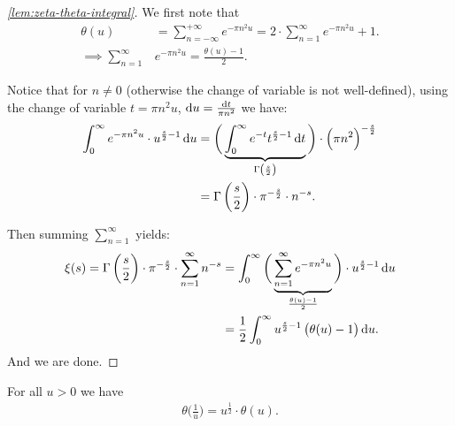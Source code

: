 \begin{proof}[\ref{lem:zeta-theta-integral}]
We first note that
\begin{align*}
    \theta(u) &= \sum_{n=-\infty}^{+\infty} e^{- \pi n^2 u} = 2 \cdot \sum_{n=1 }^{\infty} e^{- \pi n^2 u} + 1.\\
    \implies  \sum_{n=1 }^{\infty}& e^{- \pi n^2 u} = \frac{\theta(u) - 1}{2}.
\end{align*}

Notice that for $n  \neq 0$ (otherwise the change of variable is not well-defined), using the change of variable $t = \pi n^2 u$, $\dif u = \frac{\dif t}{ \pi n^2}$ we have:
\begin{align*}
    \int_0^\infty e^{- \pi n^2 u} \cdot  u^{\frac{s}{2} -1} \dif u &= \bigg( \underbrace{ \int_0^\infty e^{-t} t^{\frac{s}{2} - 1} \dif t}_{\Gamma\br{\frac{s}{2}}} \bigg) \cdot \br{\pi n^2}^{- \frac{s}{2}} \\
    &= \Gamma\br{\frac{s}{2}} \cdot \pi^{- \frac{s}{2}} \cdot n^{-s}.
\end{align*}

Then summing $\sum_{n=1}^\infty$ yields:
\begin{align*}
    \xi(s) = \Gamma\br{\frac{s}{2}} \cdot \pi^{- \frac{s}{2}} \cdot \sum_{n=1}^\infty   n^{-s} &= \int_0^\infty \bigg( \underbrace{ \sum_{n=1}^\infty  e^{- \pi n^2 u} }_{\frac{\theta(u) - 1}{2}}\bigg) \cdot  u^{\frac{s}{2} -1} \dif u\\
    &=\frac{1}{2} \int_0^\infty u^{\frac{s}{2} - 1} \br{\theta(u) - 1} \dif u.
\end{align*}
And we are done.
\end{proof}


\begin{proposition}\label{prop:theta-func-eq}
For all $u > 0$ we have
\begin{align*}
    \theta\big(\tfrac{1}{u}\big) = u^{\frac{1}{2}} \cdot \theta(u).
\end{align*}
\end{proposition}

